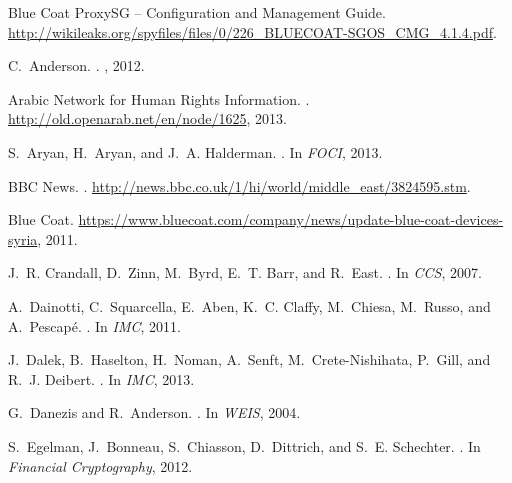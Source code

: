 \documentclass{sig-alternate-2013}
\begin{document}
\balance	
\begin{thebibliography}{10}

{Blue Coat ProxySG -- Configuration and Management Guide}.
\newblock
  \url{http://wikileaks.org/spyfiles/files/0/226_BLUECOAT-SGOS_CMG_4.1.4.pdf}.

C.~Anderson.
.
, 2012.

{Arabic Network for Human Rights Information}.
.
\newblock \url{http://old.openarab.net/en/node/1625}, 2013.

S.~Aryan, H.~Aryan, and J.~A. Halderman.
.
\newblock In {\em FOCI}, 2013.

{BBC News}.
.
\newblock \url{http://news.bbc.co.uk/1/hi/world/middle_east/3824595.stm}.

{Blue Coat}.
\newblock
  \url{https://www.bluecoat.com/company/news/update-blue-coat-devices-syria},
  2011.

J.~R. Crandall, D.~Zinn, M.~Byrd, E.~T. Barr, and R.~East.
.
\newblock In {\em CCS}, 2007.

A.~Dainotti, C.~Squarcella, E.~Aben, K.~C. Claffy, M.~Chiesa, M.~Russo, and
  A.~Pescap{\'e}.
.
\newblock In {\em IMC}, 2011.

J.~Dalek, B.~Haselton, H.~Noman, A.~Senft, M.~Crete-Nishihata, P.~Gill, and
  R.~J. Deibert.
.
\newblock In {\em IMC}, 2013.

G.~Danezis and R.~Anderson.
.
\newblock In {\em WEIS}, 2004.

S.~Egelman, J.~Bonneau, S.~Chiasson, D.~Dittrich, and S.~E. Schechter.
.
\newblock In {\em Financial Cryptography}, 2012.


\end{thebibliography}
\end{document}
